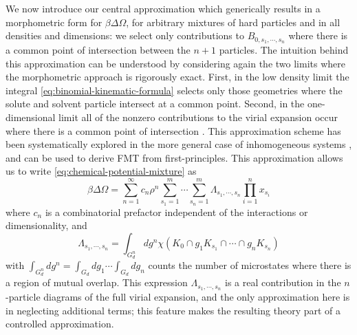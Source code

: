 \documentclass[11pt,twoside]{report}
\begin{document}
We now introduce our central approximation which generically results in a morphometric form for $\beta \Delta \Omega$, for arbitrary mixtures of hard particles and in all densities and dimensions: we select only contributions to $B_{0, s_1, \cdots, s_n}$ where there is a common point of intersection between the $n+1$ particles.
The intuition behind this approximation can be understood by considering again the two limits where the morphometric approach is rigorously exact.
First, in the low density limit the integral \eqref{eq:binomial-kinematic-formula} selects only those geometries where the solute and solvent particle intersect at a common point.
Second, in the one-dimensional limit all of the nonzero contributions to the virial expansion occur where there is a common point of intersection \cite{MarechalPRE2014}.
This approximation scheme has been systematically explored in the more general case of inhomogeneous systems \cite{LeithallPRE2011,KordenPRE2012,MarechalPRE2014}, and can be used to derive FMT from first-principles.
This approximation allows us to write \eqref{eq:chemical-potential-mixture} as
\begin{equation}\label{eq:insertion-with-lambda}
  \beta \Delta \Omega
  =
  \sum_{n=1}^\infty
  c_n
  \rho^n
  \sum_{s_1=1}^m \cdots \sum_{s_n=1}^m
  \Lambda_{s_1, \cdots, s_n}
  \prod_{i=1}^n x_{s_i}
\end{equation}
where $c_n$ is a combinatorial prefactor independent of the interactions or dimensionality, and
\begin{equation}\label{eq:n-particle-intersection-integral}
  \Lambda_{s_1, \cdots, s_n}
  =
  \int_{G_d^n} dg^n \chi(K_0 \cap g_1 K_{s_1} \cap \cdots \cap g_n K_{s_n})
\end{equation}
with $\int_{G_d^n} dg^n = \int_{G_d} dg_1 \cdots \int_{G_d} dg_n$ counts the number of microstates where there is a region of mutual overlap.
This expression $\Lambda_{s_1, \cdots, s_n}$ is a real contribution in the $n$-particle diagrams of the full virial expansion, and the only approximation here is in neglecting additional terms; this feature makes the resulting theory part of a controlled approximation.
\end{document}
